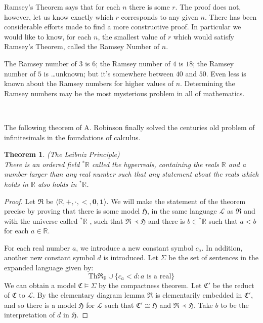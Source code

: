 \documentclass[titlepage, oneside]{amsbook}
\theoremstyle{plain}
\newtheorem{theorem}{Theorem}
\theoremstyle{definition}
\theoremstyle{remark}
\newcommand{\rstar}{\ensuremath{{}^{\ast}  \mathbb R}}
\newcommand{\lan}{\ensuremath{\mathcal{L}}}
\newcommand{\mc}{\ensuremath{\mathfrak{C}}}
\newcommand{\mh}{\ensuremath{\mathfrak{H}}}
\newcommand{\mr}{\ensuremath{\mathfrak{R}}}
\begin{document}
Ramsey's Theorem says that for each $n$ there is some $r$. The proof does not, however, let us know exactly which $r$ corresponds to any given $n$. There has been considerable efforts made to find a more constructive proof. In particular we would like to know, for each $n$, the smallest value of $r$ which would satisfy Ramsey's Theorem, called the Ramsey Number of $n$.

The Ramsey number of $3$ is $6$; the Ramsey number of $4$ is $18$; the Ramsey number of $5$ is \dots unknown; but it's somewhere between $40$ and $50$.  Even  less is known about the Ramsey numbers for higher values of $n$. Determining the Ramsey numbers may be the most mysterious problem in all of mathematics. 

\



The following theorem of A. Robinson finally solved the centuries old
problem of infinitesimals in the foundations of calculus.
 
\begin{theorem}\label{T:Leibniz}  (The Leibniz Principle)\\
%
There is an ordered field $\rstar$ called the hyperreals, containing the
reals $\mathbb R$ and a number larger than any real number such that any statement
about the reals which holds in $\mathbb R$  also holds in $\rstar$.

\end{theorem}

\begin{proof} 
Let $\mr$ be $\langle \mathbb{R} ,\pmb{+}, \pmb{\cdot}, \pmb{<} , \pmb{0} , \pmb{1} \rangle $.
We will make the statement of the theorem precise by proving that there
is some model $\mh$, in the same language $\lan$ as $\mr$ and with the
universe called $\rstar$ , such that $\mr \prec \mh$ and
there is $b \in \rstar$ such that $a < b$ for each $a \in \mathbb R$.

For each real number $a$, we introduce a new constant symbol $c_a$. In addition, another new constant symbol $d$ is introduced. Let $\Sigma$ be the set of
sentences in the expanded language given by:
\[ 
\mbox{Th}\mr_{\mathbb{R}} \cup \{c_a < d : a \mbox{ is a real} \} 
\]
We can obtain a model $\mc \models \Sigma$ by the compactness theorem.
Let $\mc'$ be the reduct of $\mc$ to $\lan$.  By the elementary diagram
lemma $\mr$ is elementarily embedded in $\mc'$, and so there is a model
$\mh$ for $\lan$ such that $\mc' \cong \mh$ and $\mr \prec \mh$. Take $b$ to be the interpretation of $d$ in $\mh$.

\end{proof}
\end{document}
